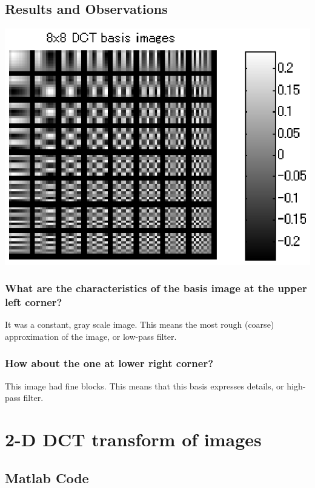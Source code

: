 \documentclass[12pt]{article}
\begin{document}
\subsection{Results and Observations}

\begin{center}
\includegraphics{../images/II1DCTBasisImage.eps}
\end{center}

\subsubsection{What are the characteristics of the basis image at the upper left corner?}

It was a constant, gray scale image. This means the most rough (coarse) approximation of the image, or low-pass filter. 

\subsubsection{How about the one at lower right corner?}

This image had fine blocks. This means that this basis expresses details, or high-pass filter. 

\newpage

\section{2-D DCT transform of images}

\subsection{Matlab Code}
\end{document}
